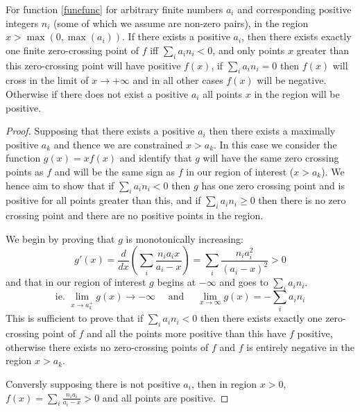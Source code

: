 \documentclass[12pt]{colt2020} %
\begin{document}
\begin{theorem}\label{mini_o_theorem}
For function \eqref{funcfunc} for arbitrary finite numbers $a_i$ and corresponding positive integers $n_i$ (some of which we assume are non-zero pairs), in the region $x>\max(0,\max(a_i))$. If there exists a positive $a_i$, then there exists exactly one finite zero-crossing point of $f$ iff $\sum_i a_in_i<0$, and only points $x$ greater than this zero-crossing point will have positive $f(x)$, if $\sum_i a_in_i=0$ then $f(x)$ will cross in the limit of $x\rightarrow +\infty$ and in all other cases $f(x)$ will be negative. Otherwise if there does not exist a positive $a_i$ all points $x$ in the region will be positive.
\end{theorem}
\begin{proof}
Supposing that there exists a positive $a_i$ then there exists a maximally positive $a_k$ and thence we are constrained $x>a_k$. In this case we consider the function $g(x)=xf(x)$ and identify that $g$ will have the same zero crossing points as $f$ and will be the same sign as $f$ in our region of interest ($x>a_k$). We hence aim to show that if $\sum_i a_in_i<0$ then $g$ has one zero crossing point and is positive for all points greater than this, and if $\sum_i a_in_i\ge 0$ then there is no zero crossing point and there are no positive points in the region.

We begin by proving that $g$ is monotonically increasing:
$$g'(x) = \frac{d}{dx}\left(\sum_i\frac{n_ia_ix}{a_i-x}\right) = \sum_i\frac{n_ia_i^2}{(a_i-x)^2}>0$$
and that in our region of interest $g$ begins at $-\infty$ and goes to $\sum_i a_in_i$.
$$\mbox{ie. }\lim_{x\rightarrow a_k^+}g(x)\rightarrow -\infty \quad\mbox{ and }\quad \lim_{x\rightarrow \infty}g(x) = -\sum_i a_in_i$$
This is sufficient to prove that if $\sum_i a_in_i <0$ then there exists exactly one zero-crossing point of $f$ and all the points more positive than this have $f$ positive, otherwise there exists no zero-crossing points of $f$ and $f$ is entirely negative in the region $x>a_k$.

Conversly supposing there is not positive $a_i$, then in region $x>0$, $f(x) = \sum_i\frac{n_ia_i}{a_i-x} >0$ and all points are positive.
\end{proof}
\end{document}
